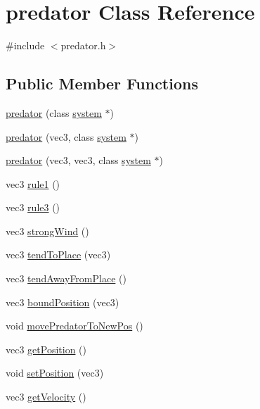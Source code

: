 \hypertarget{classpredator}{}\section{predator Class Reference}
\label{classpredator}


{\ttfamily \#include $<$predator.\+h$>$}

\subsection*{Public Member Functions}
\begin{DoxyCompactItemize}
\item 
\mbox{\hyperlink{classpredator_ac383b7a31c94d5db16c3d9ac6b21a6b4}{predator}} (class \mbox{\hyperlink{classsystem}{system}} $\ast$)
\item 
\mbox{\hyperlink{classpredator_ab37695f6e4a34848ef997baf64925fcb}{predator}} (vec3, class \mbox{\hyperlink{classsystem}{system}} $\ast$)
\item 
\mbox{\hyperlink{classpredator_a4626bc2acecb57820cd381a2f4443341}{predator}} (vec3, vec3, class \mbox{\hyperlink{classsystem}{system}} $\ast$)
\item 
vec3 \mbox{\hyperlink{classpredator_a676a00f3fcf0231ee203561bb63db10d}{rule1}} ()
\item 
vec3 \mbox{\hyperlink{classpredator_a65ea796e88837cd3d894a268f90160b5}{rule3}} ()
\item 
vec3 \mbox{\hyperlink{classpredator_af100da4595acd9a683706c6eb4b8fca5}{strong\+Wind}} ()
\item 
vec3 \mbox{\hyperlink{classpredator_a777cf9d960d012607f0ac0f8ca711564}{tend\+To\+Place}} (vec3)
\item 
vec3 \mbox{\hyperlink{classpredator_a2977439f6325236d944f4b9ad3d67161}{tend\+Away\+From\+Place}} ()
\item 
vec3 \mbox{\hyperlink{classpredator_aa905d1250c49b49af4074789afdb1a7c}{bound\+Position}} (vec3)
\item 
void \mbox{\hyperlink{classpredator_a065cda3b3c5f2d676d38d0be456311f7}{move\+Predator\+To\+New\+Pos}} ()
\item 
vec3 \mbox{\hyperlink{classpredator_a56d3ccf064af52f843fe71da8ce6a9fc}{get\+Position}} ()
\item 
void \mbox{\hyperlink{classpredator_a3fa4db231bb9b2c509629488e93dee75}{set\+Position}} (vec3)
\item 
vec3 \mbox{\hyperlink{classpredator_ae29430ec8d6778b8c72ae485b75d8dda}{get\+Velocity}} ()

\end{DoxyCompactItemize}
